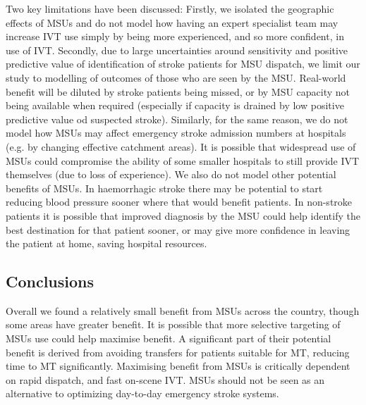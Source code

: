 Two key limitations have been discussed: Firstly, we isolated the geographic effects of MSUs and do not model how having an expert specialist team may increase IVT use simply by being more experienced, and so more confident, in use of IVT. Secondly, due to large uncertainties around sensitivity and positive predictive value of identification of stroke patients for MSU dispatch, we limit our study to modelling of outcomes of those who are seen by the MSU. Real-world benefit will be diluted by stroke patients being missed, or by MSU capacity not being available when required (especially if capacity is drained by low positive predictive value od suspected stroke). Similarly, for the same reason, we do not model how MSUs may affect emergency stroke admission numbers at hospitals (e.g. by changing effective catchment areas). It is possible that widespread use of MSUs could compromise the ability of some smaller hospitals to still provide IVT themselves (due to loss of experience). We also do not model other potential benefits of MSUs. In haemorrhagic stroke there may be potential to start reducing blood pressure sooner where that would benefit patients. In non-stroke patients it is possible that improved diagnosis by the MSU could help identify the best destination for that patient sooner, or may give more confidence in leaving the patient at home, saving hospital resources.

\subsection{Conclusions}

Overall we found a relatively small benefit from MSUs across the country, though some areas have greater benefit. It is possible that more selective targeting of MSUs use could help maximise benefit. A significant part of their potential benefit is derived from avoiding transfers for patients suitable for MT, reducing time to MT significantly. Maximising benefit from MSUs is critically dependent on rapid dispatch, and fast on-scene IVT. MSUs should not be seen as an alternative to optimizing day-to-day emergency stroke systems.